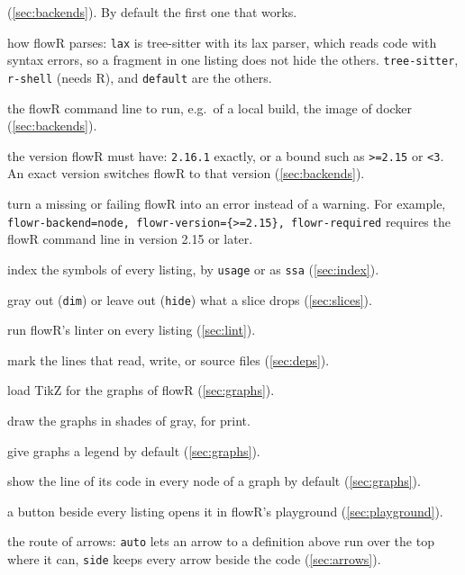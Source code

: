 \documentclass[10pt,DIV=12]{scrartcl}
\let\TT\texttt
\newcommand\code{\lstinline[language=lLatex,language addons=latex,basicstyle=\ttfamily,columns=flexible,keepspaces]}
\begin{document}
\begin{description}
  (\cref{sec:backends}). By default the first one that works.
\item {} how flowR parses: \TT{lax} is tree-sitter with its lax parser,
  which reads code with syntax errors, so a fragment in one listing does not hide the others.
  \TT{tree-sitter}, \TT{r-shell} (needs R), and \TT{default} are the others.
\item {} the flowR command line to run, e.g.\ of a local build,  the
  image of docker (\cref{sec:backends}).
\item {} the version flowR must have: \TT{2.16.1} exactly, or a bound such as
  \TT{>=2.15} or \TT{<3}. An exact version switches flowR to that version (\cref{sec:backends}).
\item {} turn a missing or failing flowR into an error instead of a
  warning. For example, \code|flowr-backend=node, flowr-version={>=2.15}, flowr-required| requires the
  flowR command line in version 2.15 or later.
\item {} index the symbols of every listing, by \TT{usage} or as \TT{ssa} (\cref{sec:index}).
\item {} gray out (\TT{dim}) or leave out (\TT{hide}) what a slice drops (\cref{sec:slices}).
\item {} run flowR's linter on every listing (\cref{sec:lint}).
\item {} mark the lines that read, write, or source files (\cref{sec:deps}).
\item {} load TikZ for the graphs of flowR (\cref{sec:graphs}).
\item {} draw the graphs in shades of gray, for print.
\item {} give graphs a legend by default (\cref{sec:graphs}).
\item {} show the line of its code in every node of a graph by default (\cref{sec:graphs}).
\item {} a button beside every listing opens it in flowR's playground (\cref{sec:playground}).
\item {} the route of arrows: \TT{auto} lets an arrow to a definition above run
  over the top where it can, \TT{side} keeps every arrow beside the code (\cref{sec:arrows}).

\end{description}
\end{document}
